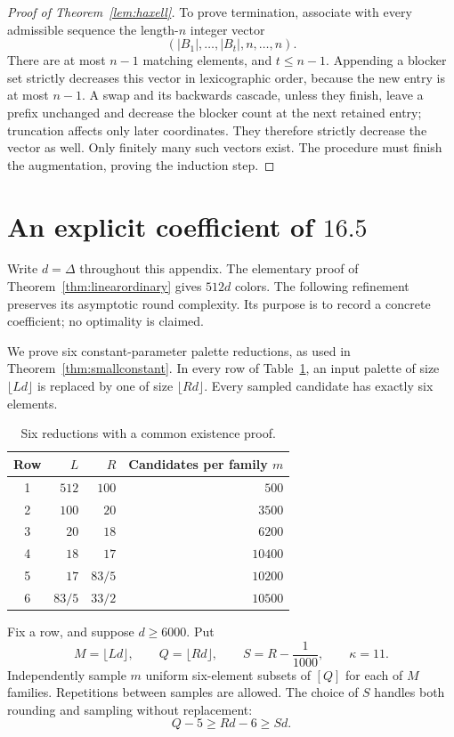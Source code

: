 \documentclass[11pt]{article}
\theoremstyle{definition}
\theoremstyle{remark}
\begin{document}
\begin{proof}[Proof of Theorem~\ref{lem:haxell}]
To prove termination, associate with every admissible sequence the
length-$n$ integer vector
\[
 (|B_1|,\ldots,|B_t|,n,\ldots,n).
\]
There are at most $n-1$ matching elements, and $t\le n-1$.
Appending a blocker set strictly decreases this vector in lexicographic
order, because the new entry is at most $n-1$.
A swap and its backwards cascade, unless they finish, leave a prefix
unchanged and decrease the blocker count at the next retained entry;
truncation affects only later coordinates.  They therefore strictly
decrease the vector as well.  Only finitely many such vectors exist.
The procedure must finish the augmentation, proving the induction step.
\end{proof}

\section{An explicit coefficient of \texorpdfstring{$16.5$}{16.5}}
\label{app:constant}

Write $d=\Delta$ throughout this appendix. The elementary proof of Theorem~\ref{thm:linearordinary} gives $512d$ colors.
The following refinement preserves its asymptotic round complexity.  Its
purpose is to record a concrete coefficient; no optimality is claimed.

We prove six constant-parameter palette reductions, as used in Theorem~\ref{thm:smallconstant}.  In every row of
Table~\ref{tab:constant-parameters}, an input palette of size
$\lfloor Ld\rfloor$ is replaced by one of size $\lfloor Rd\rfloor$.
Every sampled candidate has exactly six elements.

\begin{table}[ht]
\centering
\begin{tabular}{c r r r}
\toprule
Row & $L$ & $R$ & Candidates per family $m$\\
\midrule
1 & $512$ & $100$ & $500$\\
2 & $100$ & $20$ & $3500$\\
3 & $20$ & $18$ & $6200$\\
4 & $18$ & $17$ & $10400$\\
5 & $17$ & $83/5$ & $10200$\\
6 & $83/5$ & $33/2$ & $10500$\\
\bottomrule
\end{tabular}
\caption{Six reductions with a common existence proof.}
\label{tab:constant-parameters}
\end{table}

Fix a row, and suppose $d\ge6000$.  Put
\[
 M=\lfloor Ld\rfloor,\qquad Q=\lfloor Rd\rfloor,\qquad
 S=R-\frac1{1000},\qquad \kappa=11.
\]
Independently sample $m$ uniform six-element subsets of $[Q]$ for each of
$M$ families.  Repetitions between samples are allowed.  The choice of
$S$ handles both rounding and sampling without replacement:
\begin{equation}\label{eq:constant-rounding}
 Q-5\ge Rd-6\ge Sd.
\end{equation}
\end{document}
